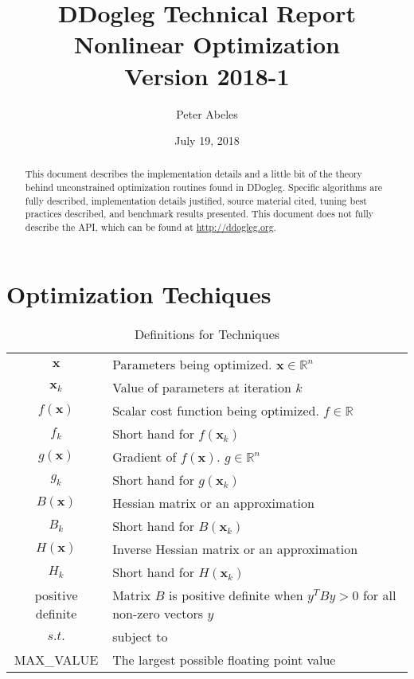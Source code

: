 \documentclass[peerreview,compsoc,onecolumn]{IEEEtran}
\newcommand{\R}{\mathbb{R}}
\begin{document}
\title{DDogleg Technical Report\\ Nonlinear Optimization\\{\Large Version 2018-1}}


\author{Peter Abeles}
\date{July 19, 2018}

\maketitle
\tableofcontents
\listoffigures
\listoftables

\IEEEpeerreviewmaketitle
\begin{abstract}
This document describes the implementation details and a little bit of the theory behind unconstrained optimization routines found in DDogleg. Specific algorithms are fully described, implementation details justified, source material cited, tuning best practices described, and benchmark results presented. This document does not fully describe the API, which can be found at \url{http://ddogleg.org}.
\end{abstract}


\section{Optimization Techiques}

\begin{table}[h]
\centering
\caption{\label{definitions:Techniques}Definitions for Techniques}
\begin{tabular}{cl}
$\bm{x}$ & Parameters being optimized. $\bm{x} \in \R^n$ \\
$\bm{x}_k$ & Value of parameters at iteration $k$ \\
$f(\bm{x})$ & Scalar cost function being optimized. $f \in \R$ \\
$f_k$ & Short hand for $f(\bm{x}_k)$ \\
$g(\bm{x})$ & Gradient of $f(\bm{x})$. $g \in \R^n$ \\
$g_k$ & Short hand for $g(\bm{x}_k)$ \\
$B(\bm{x})$ & Hessian matrix or an approximation \\ 
$B_k$ & Short hand for $B(\bm{x}_k)$ \\
$H(\bm{x})$ & Inverse Hessian matrix or an approximation \\ 
$H_k$ & Short hand for $H(\bm{x}_k)$ \\
positive definite & Matrix $B$ is positive definite when $y^T B y > 0$ for all non-zero vectors $y$  \\
$s.t.$ & subject to  \\
MAX\_VALUE & The largest possible floating point value
\end{tabular}
\end{table}
\end{document}
